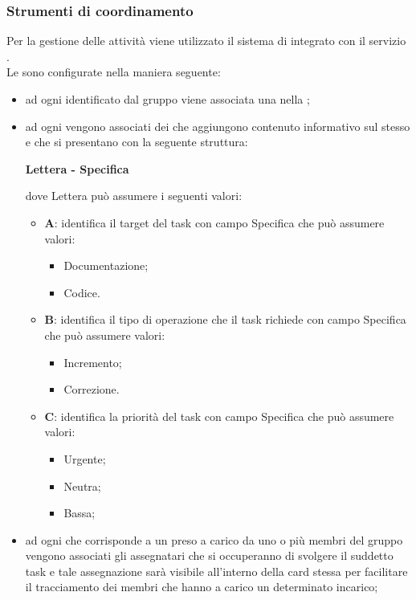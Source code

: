 		 \subsubsection{Strumenti di coordinamento}
		Per la gestione delle attività viene utilizzato il sistema di  integrato con il servizio .\\
		Le  sono configurate nella maniera seguente:
		\begin{itemize}
			\item ad ogni  identificato dal gruppo viene associata una  nella ;
			\item ad ogni  vengono associati dei  che aggiungono contenuto informativo sul  stesso e che si presentano con la seguente struttura:
			\begin{center}
	 			{\bfseries Lettera - Specifica}
	 		\end{center}
dove Lettera può assumere i seguenti valori:
			\begin{itemize}
				\item \textbf{A}: identifica il target del task con campo Specifica che può assumere valori:
				\begin{itemize}
					\item Documentazione;
					\item Codice.
				\end{itemize}
				\item \textbf{B}: identifica il tipo di operazione che il task richiede con campo Specifica che può assumere valori:
				\begin{itemize}
					\item Incremento;
					\item Correzione.
				\end{itemize}
				\item \textbf{C}: identifica la priorità del task con campo Specifica che può assumere valori:
				\begin{itemize}
					\item Urgente;
					\item Neutra;
					\item Bassa;
				\end{itemize}
			\end{itemize}
			\item ad ogni  che corrisponde a un  preso a carico da uno o più membri del gruppo vengono associati gli assegnatari che si occuperanno di svolgere il suddetto task e tale assegnazione sarà visibile all'interno della card stessa per facilitare il tracciamento dei membri che hanno a carico un determinato incarico;

\end{itemize}
